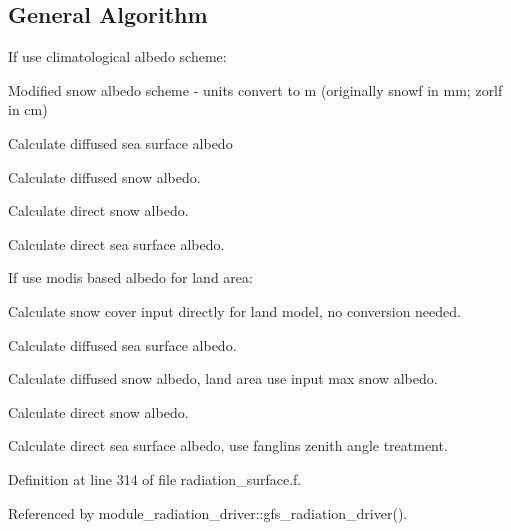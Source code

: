 \hypertarget{group___g_f_s___n_s_s_t_general}{}\subsection{General Algorithm}\label{group___g_f_s___n_s_s_t_general}

\begin{DoxyEnumerate}
\item If use climatological albedo scheme\+:
\begin{DoxyItemize}
\item Modified snow albedo scheme -\/ units convert to m (originally snowf in mm; zorlf in cm)
\item Calculate diffused sea surface albedo
\item Calculate diffused snow albedo.
\item Calculate direct snow albedo.
\item Calculate direct sea surface albedo.
\end{DoxyItemize}
\item If use modis based albedo for land area\+:
\begin{DoxyItemize}
\item Calculate snow cover input directly for land model, no conversion needed.
\item Calculate diffused sea surface albedo.
\item Calculate diffused snow albedo, land area use input max snow albedo.
\item Calculate direct snow albedo.
\item Calculate direct sea surface albedo, use fanglin\textquotesingle{}s zenith angle treatment. 
\end{DoxyItemize}
\end{DoxyEnumerate}

Definition at line 314 of file radiation\+\_\+surface.\+f.



Referenced by module\+\_\+radiation\+\_\+driver\+::gfs\+\_\+radiation\+\_\+driver().

\mbox{\label{group__module__radiation__surface_ga57ea2aa09c4194e14f2c538ef7fad7b3}} 
